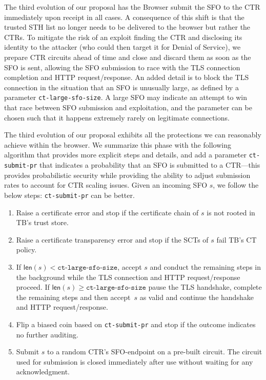 The third evolution of our proposal has the Browser submit the SFO to the CTR
immediately upon receipt in all cases. A consequence of this shift is that the
trusted STH list no longer needs to be delivered to the browser but rather the
CTRs. To mitigate the risk of an exploit finding the CTR and disclosing its
identity to the attacker (who could then target it for Denial of Service), we
prepare CTR circuits ahead of time and close and discard them as soon as the SFO
is sent, allowing the SFO submission to race with the TLS connection completion
and HTTP request/response.  An added detail is to block the TLS connection in
the situation that an SFO is unusually large, as defined by a parameter
\texttt{ct-large-sfo-size}. A large SFO may indicate an attempt to win that race
between SFO submission and exploitation, and the parameter can be chosen such
that it happens extremely rarely on legitimate connections.

The third evolution of our proposal exhibits all the protections we can
reasonably achieve within the browser. We summarize this phase with the
following algorithm that provides more explicit steps and details, and add a
parameter \texttt{ct-submit-pr} that indicates a probability that an SFO is
submitted to a CTR---this provides probabilistic security while providing the
ability to adjust submission rates to account for CTR scaling issues. Given an
incoming SFO $s$, we follow the below steps: %
\texttt{ct-submit-pr} can be better.

\begin{enumerate}
    \item Raise a certificate error and stop if the certificate chain of $s$
        is not rooted in TB's trust store.
    \item Raise a certificate transparency error and stop if the SCTs of $s$
        fail TB's CT policy.
    \item If $\mathsf{len}(s) < \texttt{ct-large-sfo-size}$, accept $s$ and
        conduct the remaining steps in the background while the TLS connection
        and HTTP request/response proceed. If $\mathsf{len}(s) \geq
        \texttt{ct-large-sfo-size}$ pause the TLS handshake, complete the
        remaining steps and then accept~$s$ as valid and continue the handshake
        and HTTP request/response.
    \item Flip a biased coin based on \texttt{ct-submit-pr} and stop if the
        outcome indicates no further auditing.
    \item Submit $s$ to a random CTR's SFO-endpoint on a pre-built circuit.
        The circuit used for submission is closed immediately after use without
        waiting for any acknowledgment.
\end{enumerate}

